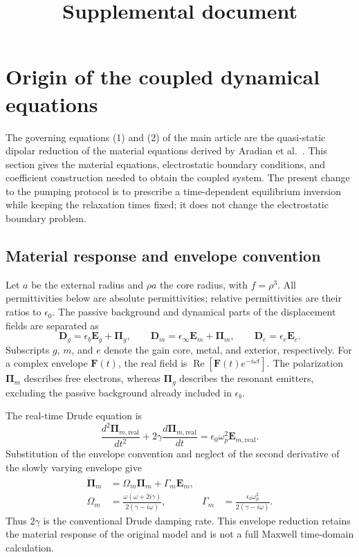 \documentclass[9pt]{osa-supplemental-document}
\title{Supplemental document}
\author{} %
\begin{document}
\maketitle

\section{Origin of the coupled dynamical equations}
\label{sec:derivation}
The governing equations (1) and (2) of the main article are the quasi-static dipolar reduction of the material equations derived by Aradian et al.~\cite{AradianArxiv:2025}. This section gives the material equations, electrostatic boundary conditions, and coefficient construction needed to obtain the coupled system. The present change to the pumping protocol is to prescribe a time-dependent equilibrium inversion while keeping the relaxation times fixed; it does not change the electrostatic boundary problem.

\subsection{Material response and envelope convention}
Let $a$ be the external radius and $\rho a$ the core radius, with $f=\rho^3$. All permittivities below are absolute permittivities; relative permittivities are their ratios to $\epsilon_0$. The passive background and dynamical parts of the displacement fields are separated as
\begin{equation}
\mathbf D_g=\epsilon_b\mathbf E_g+\bm\Pi_g,\qquad
\mathbf D_m=\epsilon_\infty\mathbf E_m+\bm\Pi_m,\qquad
\mathbf D_e=\epsilon_e\mathbf E_e.
\label{eq:displacement}
\end{equation}
Subscripts $g$, $m$, and $e$ denote the gain core, metal, and exterior, respectively. For a complex envelope $\mathbf F(t)$, the real field is $\operatorname{Re}[\mathbf F(t)e^{-i\omega t}]$. The polarization $\bm\Pi_m$ describes free electrons, whereas $\bm\Pi_g$ describes the resonant emitters, excluding the passive background already included in $\epsilon_b$.

The real-time Drude equation is
\begin{equation}
\frac{d^2\bm\Pi_{m,\mathrm{real}}}{dt^2}
+2\gamma\frac{d\bm\Pi_{m,\mathrm{real}}}{dt}
=\epsilon_0\omega_p^2\mathbf E_{m,\mathrm{real}}.
\label{eq:drude}
\end{equation}
Substitution of the envelope convention and neglect of the second derivative of the slowly varying envelope give
\begin{align}
\dot{\bm\Pi}_m&=\Omega_m\bm\Pi_m+\Gamma_m\mathbf E_m,\label{eq:metalenv}\\
\Omega_m&=\frac{\omega(\omega+2i\gamma)}{2(\gamma-i\omega)},
&\Gamma_m&=\frac{\epsilon_0\omega_p^2}{2(\gamma-i\omega)}.
\label{eq:metalcoeff}
\end{align}
Thus $2\gamma$ is the conventional Drude damping rate. This envelope reduction retains the material response of the original model and is not a full Maxwell time-domain calculation.
\end{document}
